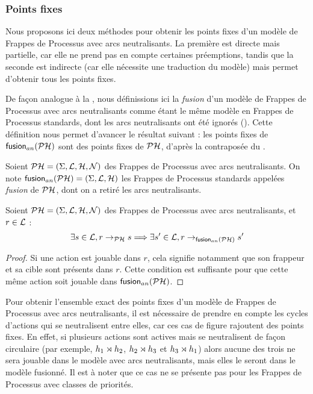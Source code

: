 
\subsubsection{Points fixes}

Nous proposons ici deux méthodes pour obtenir les points fixes d'un modèle de Frappes de Processus
avec arcs neutralisants.
La première est directe mais partielle, car elle ne prend pas en compte certaines préemptions,
tandis que la seconde est indirecte (car elle nécessite une traduction du modèle)
mais permet d'obtenir tous les points fixes.

\myskip

De façon analogue à la , nous définissions ici
la \emph{fusion} d'un modèle de Frappes de Processus avec arcs neutralisants
comme étant le même modèle en Frappes de Processus standards,
dont les arcs neutralisants ont été ignorés ().
Cette définition nous permet d'avancer le résultat suivant :
les points fixes de $\mathsf{fusion}_{an}(\mathcal{PH})$ sont des points fixes de $\mathcal{PH}$,
d'après la contraposée du .

\begin{definition}
  Soient $\mathcal{PH} = (\Sigma, \mathcal{L}, \mathcal{H}, \mathcal{N})$ des Frappes de Processus avec arcs neutralisants.
  On note $\mathsf{fusion}_{an}(\mathcal{PH}) = (\Sigma, \mathcal{L}, \mathcal{H})$
  les Frappes de Processus standards appelées \emph{fusion} de $\mathcal{PH}$,
  dont on a retiré les arcs neutralisants.
\end{definition}

\begin{theorem}
  Soient $\mathcal{PH} = (\Sigma, \mathcal{L}, \mathcal{H}, \mathcal{N})$ des Frappes de Processus avec arcs neutralisants,
  et $r \in \mathcal{L}$ :
  \[\exists s \in \mathcal{L}, r \rightarrow_{\mathcal{PH}} s \Longrightarrow
    \exists s' \in \mathcal{L}, r \rightarrow_{\mathsf{fusion}_{an}(\mathcal{PH})} s'\]
\end{theorem}

\begin{proof}
  Si une action est jouable dans $r$, cela signifie notamment
  que son frappeur et sa cible sont présents dans $r$.
  Cette condition est suffisante pour que cette même action soit jouable dans $\mathsf{fusion}_{an}(\mathcal{PH})$.
\end{proof}

Pour obtenir l'ensemble exact des points fixes d'un modèle de Frappes de Processus
avec arcs neutralisants, il est nécessaire de prendre en compte les cycles d'actions
qui se neutralisent entre elles, car ces cas de figure rajoutent des points fixes.
En effet, si plusieurs actions sont actives mais se neutralisent de façon circulaire
(par exemple, $h_1\rtimes h_2$, $h_2\rtimes h_3$ et $h_3\rtimes h_1$)
alors aucune des trois ne sera jouable dans le modèle avec arcs neutralisants,
mais elles le seront dans le modèle fusionné.
Il est à noter que
ce cas ne se présente pas pour les Frappes de Processus avec classes de priorités.

